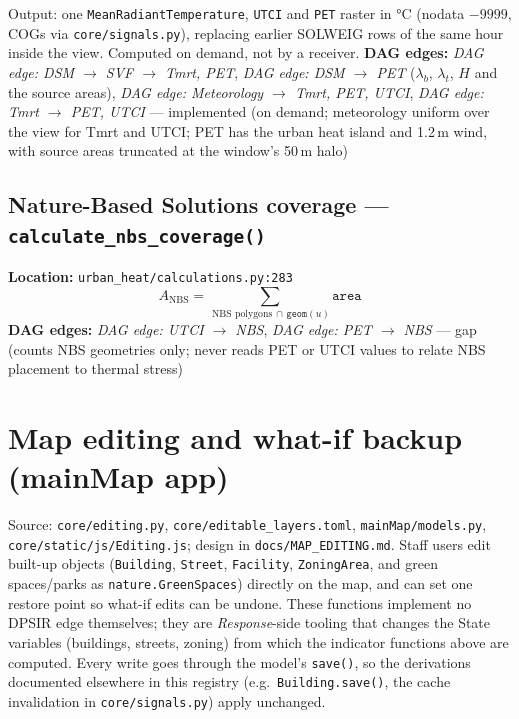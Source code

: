 \documentclass[11pt]{article}
\newcommand{\code}[1]{\texttt{#1}}
\newcommand{\dagedge}[1]{\textit{DAG edge: #1}}
\newcommand{\statusdone}{\textcolor{green!50!black}{implemented}}
\newcommand{\statusgap}{\textcolor{red!70!black}{gap}}
\begin{document}
Output: one \code{MeanRadiantTemperature}, \code{UTCI} and \code{PET} raster in \si{\celsius} (nodata $-9999$, COGs via \code{core/signals.py}), replacing earlier SOLWEIG rows of the same hour inside the view. Computed on demand, not by a receiver. \textbf{DAG edges:} \dagedge{DSM $\rightarrow$ SVF $\rightarrow$ Tmrt, PET}, \dagedge{DSM $\rightarrow$ PET} ($\lambda_b$, $\lambda_t$, $H$ and the source areas), \dagedge{Meteorology $\rightarrow$ Tmrt, PET, UTCI}, \dagedge{Tmrt $\rightarrow$ PET, UTCI} --- \statusdone{} (on demand; meteorology uniform over the view for Tmrt and UTCI; PET has the urban heat island and 1.2\,m wind, with source areas truncated at the window's 50\,m halo)

\subsection{Nature-Based Solutions coverage --- \code{calculate\_nbs\_coverage()}}
\textbf{Location:} \code{urban\_heat/calculations.py:283}
\begin{equation}
  A_{\text{NBS}} = \sum_{\,\text{NBS polygons} \,\cap\, \texttt{geom}(u)} \texttt{area}
\end{equation}
\textbf{DAG edges:} \dagedge{UTCI $\rightarrow$ NBS}, \dagedge{PET $\rightarrow$ NBS} --- \statusgap{} (counts NBS geometries only; never reads PET or UTCI values to relate NBS placement to thermal stress)

\section{Map editing and what-if backup (mainMap app)}
\label{sec:mapediting}

Source: \code{core/editing.py}, \code{core/editable\_layers.toml}, \code{mainMap/models.py}, \code{core/static/js/Editing.js}; design in \code{docs/MAP\_EDITING.md}. Staff users edit built-up objects (\code{Building}, \code{Street}, \code{Facility}, \code{ZoningArea}, and green spaces/parks as \code{nature.GreenSpaces}) directly on the map, and can set one restore point so what-if edits can be undone. These functions implement no DPSIR edge themselves; they are \emph{Response}-side tooling that changes the State variables (buildings, streets, zoning) from which the indicator functions above are computed. Every write goes through the model's \code{save()}, so the derivations documented elsewhere in this registry (e.g.\ \code{Building.save()}, the cache invalidation in \code{core/signals.py}) apply unchanged.
\end{document}
